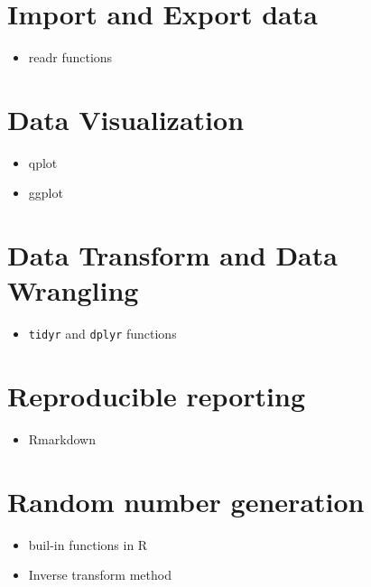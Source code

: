 \documentclass[]{article}
\providecommand{\tightlist}{%
  \setlength{\itemsep}{0pt}\setlength{\parskip}{0pt}}
\begin{document}
\hypertarget{import-and-export-data}{%
\section{Import and Export data}\label{import-and-export-data}}

\begin{itemize}
\tightlist
\item
  readr functions
\end{itemize}

\hypertarget{data-visualization}{%
\section{Data Visualization}\label{data-visualization}}

\begin{itemize}
\item
  qplot
\item
  ggplot
\end{itemize}

\hypertarget{data-transform-and-data-wrangling}{%
\section{Data Transform and Data
Wrangling}\label{data-transform-and-data-wrangling}}

\begin{itemize}
\tightlist
\item
  \texttt{tidyr} and \texttt{dplyr} functions
\end{itemize}

\hypertarget{reproducible-reporting}{%
\section{Reproducible reporting}\label{reproducible-reporting}}

\begin{itemize}
\tightlist
\item
  Rmarkdown
\end{itemize}

\hypertarget{random-number-generation}{%
\section{Random number generation}\label{random-number-generation}}

\begin{itemize}
\item
  buil-in functions in R
\item
  Inverse transform method
\end{itemize}
\end{document}
